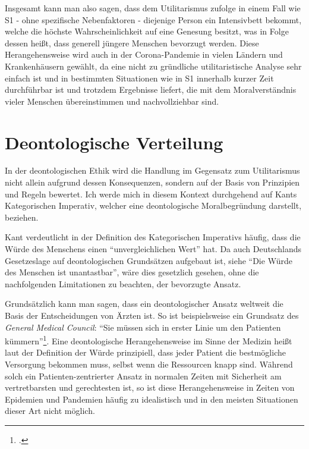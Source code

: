 \documentclass[a4paper]{article}
\begin{document}
Insgesamt kann man also sagen, dass dem Utilitarismus zufolge in einem Fall wie S1 - ohne spezifische Nebenfaktoren - diejenige Person ein Intensivbett bekommt, welche die höchste Wahrscheinlichkeit auf eine Genesung besitzt, was in Folge dessen heißt, dass generell jüngere Menschen bevorzugt werden. Diese Herangehensweise wird auch in der Corona-Pandemie in vielen Ländern und Krankenhäusern gewählt, da eine nicht zu gründliche utilitaristische Analyse sehr einfach ist und in bestimmten Situationen wie in S1 innerhalb kurzer Zeit durchführbar ist und trotzdem Ergebnisse liefert, die mit dem Moralverständnis vieler Menschen übereinstimmen und nachvollziehbar sind.


\section{Deontologische Verteilung}
In der deontologischen Ethik wird die Handlung im Gegensatz zum Utilitarismus nicht allein aufgrund dessen Konsequenzen, sondern auf der Basis von Prinzipien und Regeln bewertet. Ich werde mich in diesem Kontext durchgehend auf Kants Kategorischen Imperativ, welcher eine deontologische Moralbegründung darstellt, beziehen.

Kant verdeutlicht in der Definition des Kategorischen Imperativs häufig, dass die Würde des Menschens einen \enquote{unvergleichlichen Wert} hat. Da auch Deutschlands Gesetzeslage auf deontologischen Grundsätzen aufgebaut ist, siehe \enquote{Die Würde des Menschen ist unantastbar}, wäre dies gesetzlich gesehen, ohne die nachfolgenden Limitationen zu beachten, der bevorzugte Ansatz.

Grundsätzlich kann man sagen, dass ein deontologischer Ansatz weltweit die Basis der Entscheidungen von Ärzten ist. So ist beispielsweise ein Grundsatz des \textit{General Medical Council}: \enquote{Sie müssen sich in erster Linie um den Patienten kümmern}\footcite{medicalpractice}. Eine deontologische Herangehensweise im Sinne der Medizin heißt laut der Definition der Würde prinzipiell, dass jeder Patient die bestmögliche Versorgung bekommen muss, selbst wenn die Ressourcen knapp sind. Während solch ein Patienten-zentrierter Ansatz in normalen Zeiten mit Sicherheit am vertretbarsten und gerechtesten ist, so ist diese Herangehensweise in Zeiten von Epidemien und Pandemien häufig zu idealistisch und in den meisten Situationen dieser Art nicht möglich.
\end{document}
